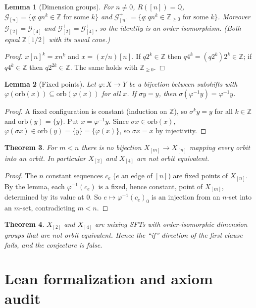 \documentclass[11pt]{article}
\newtheorem{theorem}{Theorem}
\newtheorem{lemma}[theorem]{Lemma}
\theoremstyle{definition}
\theoremstyle{remark}
\newcommand{\Z}{\mathbb{Z}}
\newcommand{\Q}{\mathbb{Q}}
\begin{document}
\begin{lemma}[Dimension groups]
For $n\ne0$, $R([n])=\Q$, $\mathcal G_{[n]}=\{q: qn^k\in\Z\text{ for some }k\}$ and
$\mathcal G_{[n]}^+=\{q:qn^k\in\Z_{\ge0}\text{ for some }k\}$. Moreover
$\mathcal G_{[2]}=\mathcal G_{[4]}$ and $\mathcal G_{[2]}^+=\mathcal G_{[4]}^+$, so the identity is
an order isomorphism. (Both equal $\Z[1/2]$ with its usual cone.)
\end{lemma}
\begin{proof}
$x[n]^k=xn^k$ and $x=(x/n)[n]$. If $q2^k\in\Z$ then $q4^k=(q2^k)2^k\in\Z$; if $q4^k\in\Z$ then
$q2^{2k}\in\Z$. The same holds with $\Z_{\ge0}$.
\end{proof}

\begin{lemma}[Fixed points]
Let $\varphi:X\to Y$ be a bijection between subshifts with
$\varphi(\mathrm{orb}(x))\subseteq\mathrm{orb}(\varphi(x))$ for all $x$. If $\sigma y=y$, then
$\sigma(\varphi^{-1}y)=\varphi^{-1}y$.
\end{lemma}
\begin{proof}
A fixed configuration is constant (induction on $\Z$), so $\sigma^ky=y$ for all $k\in\Z$ and
$\mathrm{orb}(y)=\{y\}$. Put $x=\varphi^{-1}y$. Since $\sigma x\in\mathrm{orb}(x)$,
$\varphi(\sigma x)\in\mathrm{orb}(y)=\{y\}=\{\varphi(x)\}$, so $\sigma x=x$ by injectivity.
\end{proof}

\begin{theorem}
For $m<n$ there is no bijection $X_{[m]}\to X_{[n]}$ mapping every orbit into an orbit. In
particular $X_{[2]}$ and $X_{[4]}$ are not orbit equivalent.
\end{theorem}
\begin{proof}
The $n$ constant sequences $c_e$ ($e$ an edge of $[n]$) are fixed points of $X_{[n]}$. By the lemma,
each $\varphi^{-1}(c_e)$ is a fixed, hence constant, point of $X_{[m]}$, determined by its value at
$0$. So $e\mapsto\varphi^{-1}(c_e)_0$ is an injection from an $n$-set into an $m$-set, contradicting
$m<n$.
\end{proof}

\begin{theorem}
$X_{[2]}$ and $X_{[4]}$ are mixing SFTs with order-isomorphic dimension groups that are not orbit
equivalent. Hence the ``if'' direction of the first clause fails, and the conjecture is false.
\end{theorem}

\section{Lean formalization and axiom audit}
\end{document}
